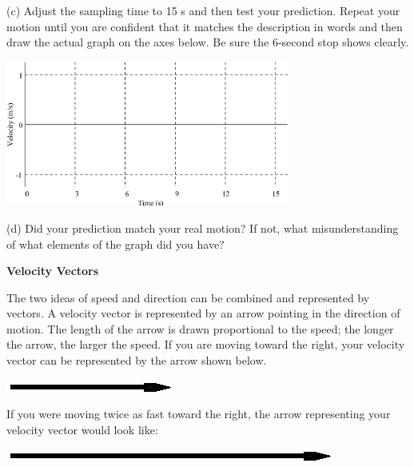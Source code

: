 (c) Adjust the sampling time to 15 s and then test your prediction. Repeat your
motion until you are confident that it matches the description in words and
then draw the actual graph on the axes below. Be sure the 6-second stop shows
clearly.

\vspace{0.3cm}
{\par\centering \includegraphics[width=0.7\textwidth]{velocity/velocity_fig2.eps} \par}
\vspace{0.3cm}

(d) Did your prediction match your real motion? If not, what misunderstanding
of what elements of the graph did you have?
\answerspace{20mm}

\pagebreak[2]
\textbf{Velocity Vectors} 

The two ideas of speed and direction can be combined and represented by vectors.
A velocity vector is represented by an arrow pointing in the direction of motion.
The length of the arrow is drawn proportional to the speed; the longer the arrow,
the larger the speed. If you are moving toward the right, your velocity vector
can be represented by the arrow shown below.

\vspace{0.3cm}
{\par\centering \includegraphics{velocity/velocity_fig3.eps} \par}
\vspace{0.3cm}

If you were moving twice as fast toward the right, the arrow representing your
velocity vector would look like:

\vspace{0.3cm}
{\par\centering \includegraphics{velocity/velocity_fig4.eps} \par}
\vspace{0.3cm}

